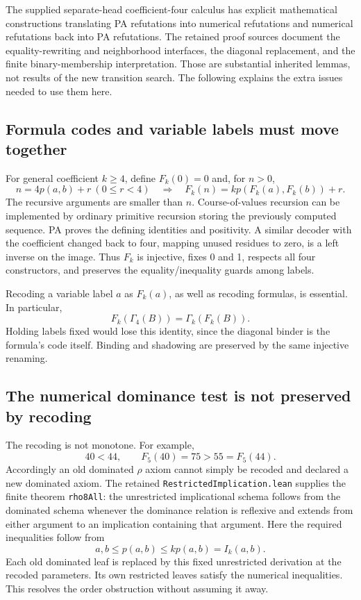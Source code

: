 \documentclass[11pt,letterpaper]{article}
\newcommand{\file}[1]{\texttt{\nolinkurl{#1}}}
\begin{document}
The supplied separate-head coefficient-four calculus has explicit
mathematical constructions translating PA refutations into numerical
refutations and numerical refutations back into PA refutations. The retained
proof sources document the equality-rewriting and neighborhood interfaces,
the diagonal replacement, and the finite binary-membership interpretation.
Those are substantial inherited lemmas, not results of the new transition
search. The following explains the extra issues needed to use them here.

\subsection{Formula codes and variable labels must move together}

For general coefficient \(k\ge4\), define \(F_k(0)=0\) and, for \(n>0\),
\[
 n=4p(a,b)+r\ (0\le r<4)
 \quad\Longrightarrow\quad
 F_k(n)=kp(F_k(a),F_k(b))+r.
\]
The recursive arguments are smaller than \(n\). Course-of-values recursion
can be implemented by ordinary primitive recursion storing the previously
computed sequence. PA proves the defining identities and positivity.
A similar decoder with the coefficient changed back to four, mapping
unused residues to zero, is a left inverse on the image. Thus \(F_k\) is
injective, fixes 0 and 1, respects all four constructors, and preserves the
equality/inequality guards among labels.

Recoding a variable label \(a\) as \(F_k(a)\), as well as recoding formulas,
is essential. In particular,
\[
 F_k(\Gamma_4(B))=\Gamma_k(F_k(B)).
\]
Holding labels fixed would lose this identity, since the diagonal binder is
the formula's code itself. Binding and shadowing are preserved by the same
injective renaming.

\subsection{The numerical dominance test is not preserved by recoding}

The recoding is not monotone. For example,
\[
 40<44,\qquad F_5(40)=75>55=F_5(44).
\]
Accordingly an old dominated \(\rho\) axiom cannot simply be recoded and
declared a new dominated axiom. The retained
\file{RestrictedImplication.lean} supplies the finite theorem
\file{rho8All}: the unrestricted implicational schema follows from the
dominated schema whenever the dominance relation is reflexive and extends
from either argument to an implication containing that argument. Here the
required inequalities follow from
\[
 a,b\le p(a,b)\le kp(a,b)=I_k(a,b).
\]
Each old dominated leaf is replaced by this fixed unrestricted derivation
at the recoded parameters. Its own restricted leaves satisfy the numerical
inequalities. This resolves the order obstruction without assuming it away.
\end{document}
